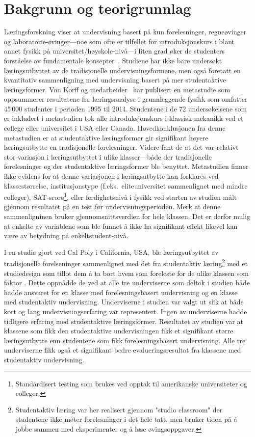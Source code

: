\documentclass[a4paper,norsk,12pt]{article}
\begin{document}
\section{Bakgrunn og teorigrunnlag}
Læringsforskning viser at undervisning basert på kun forelesninger, regne\-øvinger og laboratorie-øvinger---noe som ofte er tilfellet for introduksjonskurs i blant annet fysikk på universitet/høyskole-nivå---i liten grad øker de studenters forståelse av fundamentale konsepter~\cite{doi:10.1119/1.14030, doi:10.1119/1.18809, doi:10.1119/1.18863}. Studiene har ikke bare undersøkt læringsutbyttet av de tradisjonelle undervisningsformene, men også foretatt en kvantitativ sammenligning med undervisning basert på mer student\-aktive læringsformer. Von Korff og medarbeider~\cite{doi:10.1119/1.4964354} har publisert en metastudie som oppsummerer resultatene fra læringsanalyse i grunnleggende fysikk som omfatter 45\,000 studenter i perioden 1995 til 2014. Studentene i de 72 undersøkelsene som er inkludert i metastudien tok alle introduksjonskurs i klassisk mekanikk ved et college eller universitet i USA eller Canada. Hovedkonklusjonen fra denne metastudien er at studentaktive læringsformer gir signifikant høyere læringsutbytte en tradisjonelle forelesninger. Videre fant de at det var relativt stor variasjon i læringsutbyttet i ulike klasser---både der tradisjonelle forelesninger og der studentaktive læringsformer ble benyttet. Metastudien finner ikke evidens for at denne variasjonen i læringsutbytte kan forklares ved klassestørrelse, institusjonstype (f.eks.~eliteuniversitet sammenlignet med mindre colleger), SAT-score\footnote{Standardisert testing som brukes ved opptak til amerikanske universiteter og colleger.}, eller ferdighetsnivå i fysikk ved starten av studien målt gjennom resultatet på en test før undervisningsperioden. Merk at denne sammenligninen bruker gjennomsnittsverdien for hele klassen. Det er derfor mulig at enkelte av variablene som ble funnet å ikke ha signifikant effekt likevel kan være av betydning på enkeltstudent-nivå.

I en studie gjort ved Cal Poly i California, USA, ble læringsutbyttet av tradisjonelle forelseninger sammenlignet med det fra studentaktiv læring\footnote{Studentaktiv læring var her realisert gjennom "studio classroom" der studentene ikke møter forelesninger i det hele tatt, men bruker tiden på å jobbe sammen med eksperimenter og å løse øvingsoppgaver.} med et studiedesign som tillot dem å ta bort hvem som foreleste for de ulike klassen som faktor \cite{FiveEasyLessons}. Dette oppnådde de ved at alle tre underviserne som deltok i studien både hadde ansvaret for en klasse med forelesningsbasert undervisning og en klasse med studentaktiv undervisning. Underviserne i studien var valgt ut slik at både kort og lang undervisningserfaring var representert. Ingen av underviserne hadde tidligere erfaring med studentaktive læringsformer. Resultatet av studien var at klassene som fikk den studentaktive undervisningen fikk et signifikant større læringsutbytte enn studentene som fikk forelesningsbasert undervisning. Alle tre underviserne fikk også et signifikant bedre evalueringsresultat fra klassene med studentaktiv undervisning.
\end{document}
